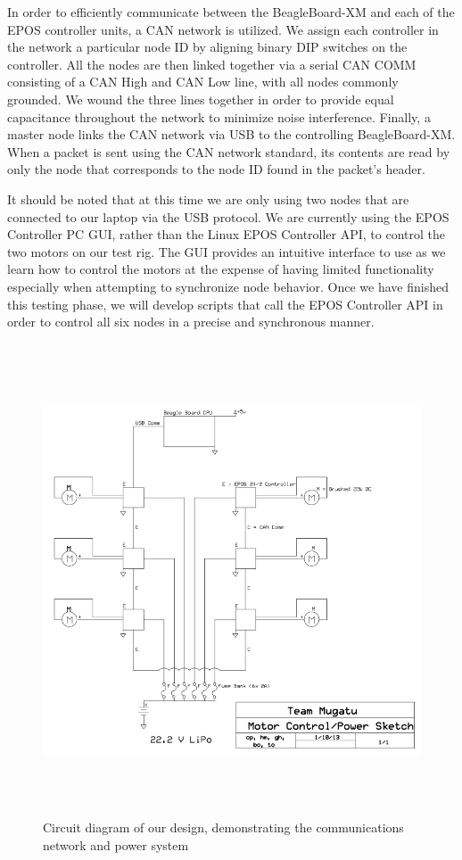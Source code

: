 \documentclass[11pt]{article}
\begin{document}
In order to efficiently communicate between the BeagleBoard-XM and each of the EPOS controller units, a CAN network is utilized. We assign each controller in the network a particular node ID by aligning binary DIP switches on the controller. All the nodes are then linked together via a serial CAN COMM consisting of a CAN High and CAN Low line, with all nodes commonly grounded. We wound the three lines together in order to provide equal capacitance throughout the network to minimize noise interference. Finally, a master node links the CAN network via USB to the controlling BeagleBoard-XM. When a packet is sent using the CAN network standard, its contents are read by only the node that corresponds to the node ID found in the packet’s header.

It should be noted that at this time we are only using two nodes that are connected to our laptop via the USB protocol. We are currently using the EPOS Controller PC GUI, rather than the Linux EPOS Controller API, to control the two motors on our test rig. The GUI provides an intuitive interface to use as we learn how to control the motors at the expense of having limited functionality especially when attempting to synchronize node behavior.  Once we have finished this testing phase, we will develop scripts that call the EPOS Controller API in order to control all six nodes in a precise and synchronous manner.

\begin{figure}[H]
\centering
\includegraphics[width=15cm,height=14cm]{motorcontrolsketch.png}
\caption{Circuit diagram of our design, demonstrating the communications network and power system}
\label{fig:motorcircuit}
\end{figure}
\end{document}
